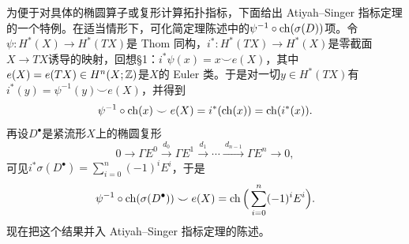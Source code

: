为便于对具体的椭圆算子或复形计算拓扑指标，下面给出 Atiyah–Singer 指标定理的一个特例。在适当情形下，可化简定理陈述中的$\psi^{-1}\circ\operatorname{ch}(\sigma(D))$项。令$\psi:H^*(X)\to H^*(TX)$是 Thom 同构，$i^*:H^*(TX)\to H^*(X)$是零截面$X\to TX$诱导的映射，回想§1：$i^*\psi(x)=x\smile e(X)$，其中$e(X)=e(TX)\in H^n(X;\mathbb{Z})$是$X$的 Euler 类。于是对一切$y\in H^*(TX)$有$i^*(y)=\psi^{-1}(y)\smile e(X)$，并得到
\[
\psi^{-1}\circ\operatorname{ch}(x)\smile e(X)=i^*(\operatorname{ch}(x))=\operatorname{ch}(i^*(x)).
\]
再设$D^\bullet$是紧流形$X$上的椭圆复形
\[
0\longrightarrow\Gamma E^0\xrightarrow{\ d_0\ }\Gamma E^1\xrightarrow{\ d_1\ }\cdots\xrightarrow{\ d_{n-1}\ }\Gamma E^n\longrightarrow 0,
\]
可见$i^*\sigma(D^\bullet)=\sum_{i=0}^n(-1)^iE^i$，于是
\[
\psi^{-1}\circ\operatorname{ch}(\sigma(D^\bullet))\smile e(X)=\operatorname{ch}\Big(\sum_{i=0}^n(-1)^iE^i\Big).
\]
现在把这个结果并入 Atiyah–Singer 指标定理的陈述。

